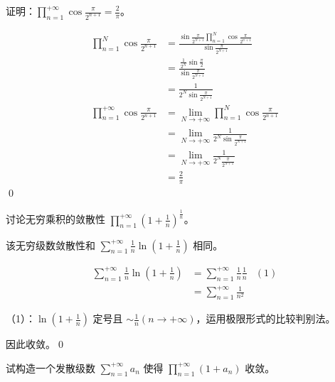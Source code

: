 \begin{ques}
	证明：$\displaystyle \prod _{n=1}^{+\infty }\cos\frac{\pi }{2^{n+1}} =\frac{2}{\pi }$。
\end{ques}


\begin{align*}
	\prod _{n=1}^{N}\cos\frac{\pi }{2^{n+1}} & =\frac{\sin\frac{\pi }{2^{N+1}}\prod _{n=1}^{N}\cos\frac{\pi }{2^{n+1}}}{\sin\frac{\pi }{2^{N+1}}}\\
	& =\frac{\frac{1}{2^{N}}\sin\frac{\pi }{2}}{\sin\frac{\pi }{2^{N+1}}}\\
	& =\frac{1}{2^{N}\sin\frac{\pi }{2^{N+1}}}\\
	\prod _{n=1}^{+\infty }\cos\frac{\pi }{2^{n+1}} & =\lim _{N\rightarrow +\infty }\prod _{n=1}^{N}\cos\frac{\pi }{2^{n+1}}\\
	& =\lim _{N\rightarrow +\infty }\frac{1}{2^{N}\sin\frac{\pi }{2^{N+1}}}\\
	& =\lim _{N\rightarrow +\infty }\frac{1}{2^{N}\frac{\pi }{2^{N+1}}}\\
	& =\frac{2}{\pi }
\end{align*}
\qed 



\begin{ques}
	讨论无穷乘积的敛散性 $\displaystyle \prod _{n=1}^{+\infty }\left( 1+\frac{1}{n}\right)^{\frac{1}{n}}$。
\end{ques}



该无穷级数敛散性和 $\displaystyle \sum _{n=1}^{+\infty }\frac{1}{n}\ln\left( 1+\frac{1}{n}\right)$ 相同。




\begin{align*}
	\sum _{n=1}^{+\infty }\frac{1}{n}\ln\left( 1+\frac{1}{n}\right) & =\sum _{n=1}^{+\infty }\frac{1}{n}\frac{1}{n} & ( 1)\\
	& =\sum _{n=1}^{+\infty }\frac{1}{n^{2}} & 
\end{align*}

（1）：$\displaystyle \ln\left( 1+\frac{1}{n}\right)$ 定号且 $\displaystyle \sim \frac{1}{n}\left( n\rightarrow +\infty \right)$，运用极限形式的比较判别法。

因此收敛。\qed 





\begin{ques}
	试构造一个发散级数 $\displaystyle \sum _{n=1}^{+\infty } a_{n}$ 使得 $\displaystyle \prod _{n=1}^{+\infty }( 1+a_{n})$ 收敛。
\end{ques}



